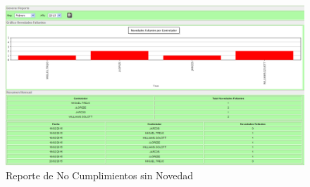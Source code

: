 \documentclass[oneside,12pt, letterpaper, titlepage]{book}
\begin{document}
\begin{appendices}
\begin{figure}[H]
    \centering
    \includegraphics[scale=0.35]{./images/ReporteControladores}
    \caption{Reporte de No Cumplimientos sin Novedad}
    \label{fig:RCKPI}
\end{figure}

\end{appendices}
\end{document}

